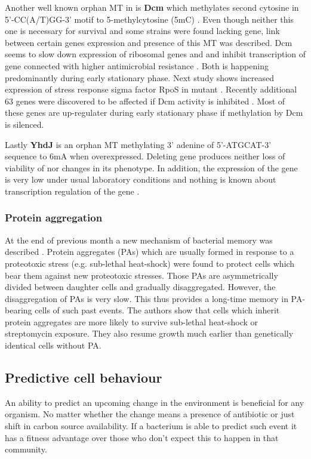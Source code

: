 Another well known orphan MT in  is \textbf{Dcm} which methylates second cytosine in 5'-CC(A/T)GG-3' motif to 5-methylcytosine (5mC) \cite{marinus1973isolation}.
Even though neither this one is necessary for  survival and some strains were found lacking  gene, link between certain genes expression and presence of this MT was described.
Dcm seems to slow down expression of ribosomal genes  and  and inhibit transcription of  gene connected with higher antimicrobial resistance \cite{militello2012conservation, militello2014cytosine}.
Both is happening predominantly during early stationary phase.
Next study shows increased expression of stress response sigma factor RpoS in  mutant \cite{kahramanoglou2012genomics}.
Recently additional 63 genes were discovered to be affected if Dcm activity is inhibited \cite{militello20165}.
Most of these genes are up-regulater during early stationary phase if methylation by Dcm is silenced.

Lastly \textbf{YhdJ} is an orphan MT methylating 3' adenine of 5'-ATGCAT-3' sequence to 6mA when overexpressed.
Deleting  gene produces neither loss of viability of  nor changes in its phenotype.
In addition, the expression of the gene is very low under usual laboratory conditions and nothing is known about transcription regulation of the gene \cite{broadbent2007yhdj}.

\subsubsection{Protein aggregation}
At the end of previous month a new mechanism of bacterial memory was described \cite{govers2018protein}.
Protein aggregates (PAs) which are usually formed in response to a proteotoxic stress (e.g. sub-lethal heat-shock) were found to protect cells which bear them against new proteotoxic stresses.
Those PAs are asymmetrically divided between daughter cells and gradually disaggregated.
However, the disaggregation of PAs is very slow.
This thus provides a long-time memory in PA-bearing cells of such past events.
The authors show that cells which inherit protein aggregates are more likely to survive sub-lethal heat-shock or streptomycin exposure.
They also resume growth much earlier than genetically identical cells without PA.

\subsection{Predictive cell behaviour}
An ability to predict an upcoming change in the environment is beneficial for any organism.
No matter whether the change means a presence of antibiotic or just shift in carbon source availability.
If a bacterium is able to predict such event it has a fitness advantage over those who don't expect this to happen in that community.

